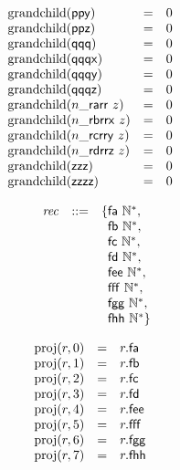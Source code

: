 $$\begin{array}{@{}lcl@{}l@{}}
{\mathrm{grandchild}}(\mathsf{ppy}) &=& 0 \\
{\mathrm{grandchild}}(\mathsf{ppz}) &=& 0 \\
{\mathrm{grandchild}}(\mathsf{qqq}) &=& 0 \\
{\mathrm{grandchild}}(\mathsf{qqqx}) &=& 0 \\
{\mathrm{grandchild}}(\mathsf{qqqy}) &=& 0 \\
{\mathrm{grandchild}}(\mathsf{qqqz}) &=& 0 \\
{\mathrm{grandchild}}({n}{\mathsf{\_}}{\mathsf{ra}}{\mathsf{rr}}~z) &=& 0 \\
{\mathrm{grandchild}}({n}{\mathsf{\_}}{\mathsf{rb}}{\mathsf{rrx}}~z) &=& 0 \\
{\mathrm{grandchild}}({n}{\mathsf{\_}}{\mathsf{rc}}{\mathsf{rry}}~z) &=& 0 \\
{\mathrm{grandchild}}({n}{\mathsf{\_}}{\mathsf{rd}}{\mathsf{rrz}}~z) &=& 0 \\
{\mathrm{grandchild}}(\mathsf{zzz}) &=& 0 \\
{\mathrm{grandchild}}(\mathsf{zzzz}) &=& 0 \\
\end{array}
$$

\vspace{1ex}

$$
\begin{array}{@{}lrrl@{}l@{}}
& {\mathit{rec}} &::=& \{ \begin{array}[t]{@{}l@{}l@{}}
\mathsf{fa}~{\mathbb{N}^\ast},\; \\
  \mathsf{fb}~{\mathbb{N}^\ast},\; \\
  \mathsf{fc}~{\mathbb{N}^\ast},\; \\
  \mathsf{fd}~{\mathbb{N}^\ast},\; \\
  \mathsf{fee}~{\mathbb{N}^\ast},\; \\
  \mathsf{fff}~{\mathbb{N}^\ast},\; \\
  \mathsf{fgg}~{\mathbb{N}^\ast},\; \\
  \mathsf{fhh}~{\mathbb{N}^\ast} \}\end{array} \\
\end{array}
$$

$$
\begin{array}{@{}lcl@{}l@{}}
{\mathrm{proj}}(r, 0) &=& r{.}\mathsf{fa} \\
{\mathrm{proj}}(r, 1) &=& r{.}\mathsf{fb} \\
{\mathrm{proj}}(r, 2) &=& r{.}\mathsf{fc} \\
{\mathrm{proj}}(r, 3) &=& r{.}\mathsf{fd} \\
{\mathrm{proj}}(r, 4) &=& r{.}\mathsf{fee} \\
{\mathrm{proj}}(r, 5) &=& r{.}\mathsf{fff} \\
{\mathrm{proj}}(r, 6) &=& r{.}\mathsf{fgg} \\
{\mathrm{proj}}(r, 7) &=& r{.}\mathsf{fhh} \\
\end{array}
$$

